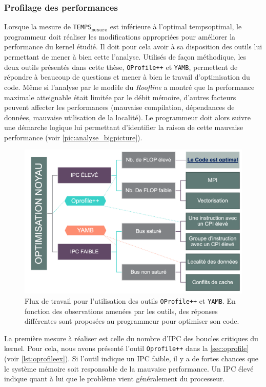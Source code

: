     \subsubsection{Profilage des performances}

        Lorsque la mesure de \texttt{TEMPS}$_\texttt{mesure}$ est inférieure à l'optimal \gls{tempsoptimal}, le programmeur doit réaliser les modifications appropriées pour améliorer la performance du \gls{kernel} étudié. Il doit pour cela avoir à sa disposition des outils lui permettant de mener à bien cette l'analyse. Utilisés de façon méthodique, les deux outils présentés dans cette thèse, \verb|OProfile++| et \verb|YAMB|, permettent de répondre à beaucoup de questions et mener à bien le travail d'optimisation du code.
        Même si l'analyse par le modèle du \textit{Roofline} a montré que la performance maximale atteignable était limitée par le débit mémoire, d'autres facteurs peuvent affecter les performances (mauvaise compilation, dépendances de données, mauvaise utilisation de la localité). Le programmeur doit alors suivre une démarche logique lui permettant d'identifier la raison de cette mauvaise performance (voir \autoref{pic:analyse_bigpicture}).
        
        \begin{figure}
            \center
            \includegraphics[width=12cm]{images/analyse_bigpicture.png}
            \caption{\label{pic:analyse_bigpicture} Flux de travail pour l'utilisation des outils \texttt{OProfile++} et \texttt{YAMB}. En fonction des observations amenées par les outils, des réponses différentes sont proposées au programmeur pour optimiser son code.}
        \end{figure}

        La première mesure à réaliser est celle du nombre d'\gls{IPC} des boucles critiques du kernel. Pour cela, nous avons présenté l'outil \verb=Oprofile++= dans la \autoref{sec:oprofile} (voir \autoref{lst:oprofileex}). Si l'outil indique un IPC faible, il y a de fortes chances que le système mémoire soit responsable de la mauvaise performance. Un IPC élevé indique quant à lui que le problème vient généralement du processeur.


